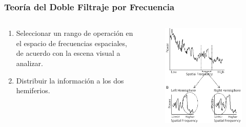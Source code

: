 \documentclass[
11pt, %
%
aspectratio=169, %
]{beamer}
\begin{document}
	\begin{frame}
		\frametitle{Teor\'ia del Doble Filtraje por Frecuencia}
		
		\begin{columns}[c] %
			\begin{column}{0.5\textwidth} %
				\begin{enumerate}
					\item Seleccionar un rango de operación en el espacio de frecuencias espaciales, de acuerdo con la escena visual a analizar.
					\item Distribuir la información a los dos hemiferios.
				\end{enumerate}	
				
			\end{column}
		
			\begin{column}{0.5\textwidth} %
			\begin{figure}[h!]
				\centering
				\includegraphics[scale=0.3]{Graphics/dff}
			\end{figure} 	
				
				
			\end{column}
		\end{columns}
		
		
		
		
	\end{frame}
\end{document}
